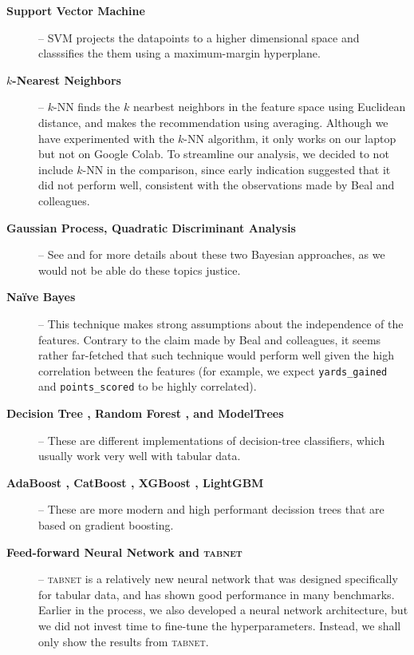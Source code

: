 \documentclass[10pt]{article}
\begin{document}
\begin{description}
\item[\bf Support Vector Machine] -- SVM \cite{cortes1995support}
projects the datapoints to a higher dimensional space
and classsifies the them using a maximum-margin hyperplane.

\item[\bf $k$-Nearest Neighbors] -- $k$-NN \cite{cover1967nearest}
finds the $k$ nearbest neighbors in the feature space using Euclidean distance,
and makes the recommendation using averaging. Although we have experimented with
 the $k$-NN algorithm, it only works on our laptop but not on Google Colab. To
streamline our analysis, we decided to not include $k$-NN in the comparison, since
early indication suggested that it did not perform well, consistent with
the observations made by Beal and colleagues.

\item[\bf Gaussian Process, Quadratic Discriminant Analysis] --
See \cite{williams2006gaussian} and \cite{srivastava2007bayesian}
for more details about these two Bayesian approaches, as we would not be
able do these topics justice.

\item[\bf Na\"ive Bayes] -- This technique \cite{rish2001empirical} makes
strong assumptions about the independence of the features. Contrary to the claim
made by Beal and colleagues, it seems rather far-fetched that such technique 
would perform well given the high correlation between the features (for example, we
expect \texttt{yards\_gained} and \texttt{points\_scored} to be highly correlated).

\item[\bf Decision Tree \cite{breiman2017classification},
Random Forest \cite{breiman2001random},
and ModelTrees \cite{broelemann2018gradient}] --
These are different implementations of decision-tree classifiers, which
usually work very well with tabular data.

\item[\bf AdaBoost \cite{freund1997decision},
CatBoost \cite{prokhorenkova2018catboost}, XGBoost \cite{chen2016xgboost}, LightGBM
\cite{ke2017lightgbm}] -- These are more modern and high performant decission trees that
are based on gradient boosting.


\item[\bf Feed-forward Neural Network and \textsc{tabnet} \cite{arik2021tabnet}] --
\textsc{tabnet} is a relatively new neural network that was designed specifically for
tabular data, and has shown good performance in many benchmarks. Earlier in the
process, we also developed a neural network architecture, but we did not invest
time to fine-tune the hyperparameters. Instead, we shall only show the results from
\textsc{tabnet}.


\end{description}
\end{document}
